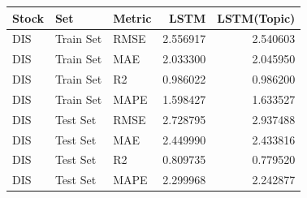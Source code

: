 \begin{tabular}{lllrr}
\toprule
Stock & Set & Metric & LSTM & LSTM(Topic) \\
\midrule
DIS & Train Set & RMSE & 2.556917 & 2.540603 \\
DIS & Train Set & MAE & 2.033300 & 2.045950 \\
DIS & Train Set & R2 & 0.986022 & 0.986200 \\
DIS & Train Set & MAPE & 1.598427 & 1.633527 \\
DIS & Test Set & RMSE & 2.728795 & 2.937488 \\
DIS & Test Set & MAE & 2.449990 & 2.433816 \\
DIS & Test Set & R2 & 0.809735 & 0.779520 \\
DIS & Test Set & MAPE & 2.299968 & 2.242877 \\
\bottomrule
\end{tabular}
